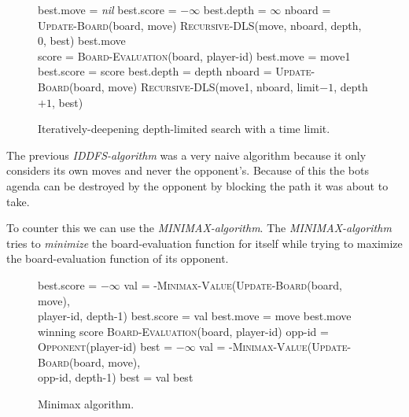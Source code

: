 \documentclass[a4paper,11pt]{article}
\begin{document}
\begin{figure}
\begin{algorithmic}
\State best.move = \emph{nil}
\State best.score = $-\infty$
\State best.depth = $\infty$
  \State nboard = \textsc{Update-Board}(board, move)
  \State \textsc{Recursive-DLS}(move, nboard, depth, 0, best)
 \EndFor
  \State \Return best.move
 \EndIf
\EndFor
\EndFunction
\\
\State score = \textsc{Board-Evaluation}(board, player-id)
\State best.move = move1
\State best.score = score
\State best.depth = depth
\EndIf
{}
\State \Return
\EndIf
{}
 \State nboard = \textsc{Update-Board}(board, move)
 \State \textsc{Recursive-DLS}(move1, nboard, limit$-1$, depth$+1$, best)
\EndFor
\EndFunction
\end{algorithmic}
\caption{Iteratively-deepening depth-limited search with a time limit.}
\end{figure}

The previous \emph{IDDFS-algorithm} was a very naive algorithm because it only
considers its own moves and never the opponent's. Because of this the bots
agenda can be destroyed by the opponent by blocking the path it was about
to take.

To counter this we can use the \emph{MINIMAX-algorithm}. The
\emph{MINIMAX-algorithm} tries to \emph{minimize} the board-evaluation function
for itself while trying to maximize the board-evaluation function of its
opponent.

\begin{figure}
\begin{algorithmic}
  \State best.score = $-\infty$
    \State val = -\textsc{Minimax-Value}(\textsc{Update-Board}(board, move), \\
    \hspace{160pt} player-id, depth-1)
      \State best.score = val
      \State best.move = move
    \EndIf
  \EndFor
  \State \Return best.move
\EndFunction
\\
  \State \Return winning score
  \State \Return \textsc{Board-Evaluation}(board, player-id)
\Else
  \State opp-id = \textsc{Opponent}(player-id)
  \State best = $-\infty$
    \State val = -\textsc{Minimax-Value}(\textsc{Update-Board}(board, move), \\
    \hspace{180pt} opp-id, depth-1)
      \State best = val
    \EndIf
  \EndFor
  \State \Return best
\EndIf
\EndFunction
\end{algorithmic}
\caption{Minimax algorithm.}
\end{figure}
\end{document}
